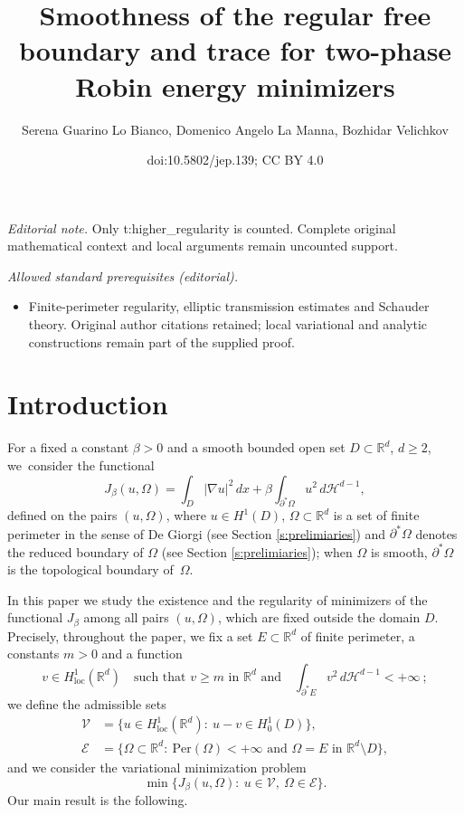 \documentclass[11pt]{article}
\title{Smoothness of the regular free boundary and trace for two-phase Robin energy minimizers}
\author{Serena Guarino Lo Bianco, Domenico Angelo La Manna, Bozhidar Velichkov}
\date{doi:10.5802/jep.139; CC BY 4.0}
\numberwithin{equation}{section}
\newcommand{\loc}{\mathrm{loc}}
\newcommand{\Per}{\mathrm{Per}}
\theoremstyle{plain}
\theoremstyle{definition}
\def\R{\mathbb{R}}
\def\HH{\mathcal{H}}
\begin{document}
\maketitle
\noindent\textit{Editorial note.} Only t:higher\_regularity is counted. Complete original mathematical context and local arguments remain uncounted support.\par\medskip
\noindent\textit{Allowed standard prerequisites (editorial).}\begin{itemize}
\item Finite-perimeter regularity, elliptic transmission estimates and Schauder theory. Original author citations retained; local variational and analytic constructions remain part of the supplied proof.
\end{itemize}\medskip
\section{Introduction}\label{s:intro}
For a fixed a constant $\beta>0$ and a smooth bounded open set $D\subset \R^d$, $d\ge 2$, we~consider the functional
\[J_\beta(u,\Omega)=\int_D|\nabla u|^2\,dx+\beta\int_{\partial^\ast \Omega}u^2\,d\HH^{d-1},\]
defined on the pairs $(u,\Omega)$, where $u\in H^1(D)$, $\Omega\subset\R^d$ is a set of finite perimeter in the sense of De Giorgi (see Section \ref{s:prelimiaries})
and $\partial^\ast\Omega$ denotes the reduced boundary of $\Omega$ (see Section \ref{s:prelimiaries}); when $\Omega$ is smooth, $\partial^\ast\Omega$ is the topological boundary of~$\Omega$.

In this paper we study the existence and the regularity of minimizers of the functional $J_\beta$
among all pairs $(u,\Omega)$, which are fixed outside the domain $D$. Precisely, throughout the paper, we fix a set $E\subset\R^d$ of finite perimeter, a constants $m>0$ and a function
\[v\in H^1_{\loc}(\R^d)\quad\text{such that $v\ge m$ in $\R^d$ and}\quad\int_{\partial^\ast E}v^2\,d\HH^{d-1}<+\infty\ ;\]
we define the admissible sets
\begin{align*}
\mathcal V&=\big\{u\in H^1_{\loc}(\R^d):\ u-v\in H^1_0(D)\big\},\\
\mathcal E&=\big\{\Omega\subset\R^d:\ \Per(\Omega)<+\infty\text{ and } \Omega=E \text{ in } \R^d\setminus D\big\},
\end{align*}
and we consider the variational minimization problem
\begin{equation}\label{e:pb}
\min\big\{J_\beta(u,\Omega):\ u\in\mathcal V,\ \Omega\in\mathcal E\big\}.
\end{equation}
Our main result is the following.
\end{document}
